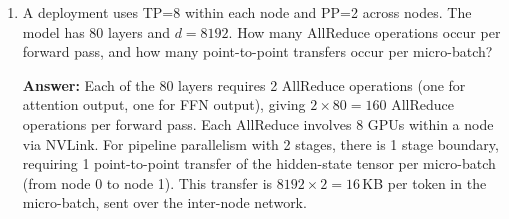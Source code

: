 \begin{enumerate}
  \item A deployment uses TP=8 within each node and PP=2 across nodes. The model has 80 layers and $d = 8192$. How many AllReduce operations occur per forward pass, and how many point-to-point transfers occur per micro-batch?

  \textbf{Answer:} Each of the 80 layers requires 2 AllReduce operations (one for attention output, one for FFN output), giving $2 \times 80 = 160$ AllReduce operations per forward pass. Each AllReduce involves 8 GPUs within a node via NVLink. For pipeline parallelism with 2 stages, there is 1 stage boundary, requiring 1 point-to-point transfer of the hidden-state tensor per micro-batch (from node 0 to node 1). This transfer is $8192 \times 2 = 16$\,KB per token in the micro-batch, sent over the inter-node network.
\end{enumerate}
